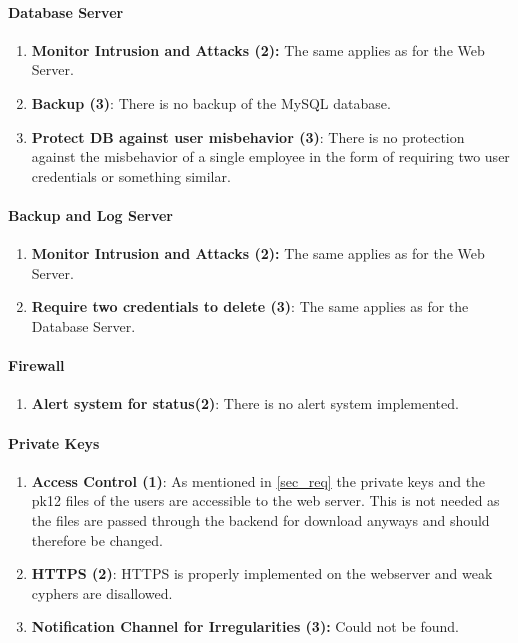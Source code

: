 \documentclass[english]{article}
\begin{document}
\paragraph{Database Server}
\begin{enumerate}[label=(\alph*)]
	\item \textbf{Monitor Intrusion and Attacks (2):} The same applies as for the Web Server.
	\item \textbf{Backup (3)}: There is no backup of the MySQL database.
	\item \textbf{Protect DB against user misbehavior (3)}: There is no protection against the misbehavior of a single employee in the form of requiring two user credentials or something similar.
\end{enumerate} 

\paragraph{Backup and Log Server}
\begin{enumerate}[label=(\alph*)]
	\item \textbf{Monitor Intrusion and Attacks (2):} The same applies as for the Web Server.
	\item \textbf{Require two credentials to delete (3)}: The same applies as for the Database Server.
\end{enumerate} 

\paragraph{Firewall}   
\begin{enumerate}[label=(\alph*)] 
	\item \textbf{Alert system for status(2)}: There is no alert system implemented.
\end{enumerate}

\paragraph{Private Keys}
\begin{enumerate}[label=(\alph*)]
\item \textbf{Access Control (1)}: As mentioned in \ref{sec_req} the private keys and the pk12 files of the users are accessible to the web server. This is not needed as the files are passed through the backend for download anyways and should therefore be changed.
\item \textbf{HTTPS (2)}: HTTPS is properly implemented on the webserver and weak cyphers are disallowed.
\item \textbf{Notification Channel for Irregularities (3):} Could not be found.
\end{enumerate} 
\end{document}
